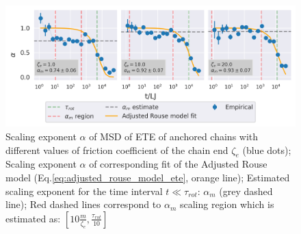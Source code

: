 \documentclass[
    paper=A4,pagesize=automedia,fontsize=12pt,
    BCOR=15mm,DIV=22,
    twoside,headinclude,footinclude=false,
    fleqn,             %
    bibliography=totocnumbered,          %
    listof=totoc,                %
    listof=flat,                 %
    cleardoublepage=empty      %
    numbers=endperiod
]{scrartcl}
\begin{document}
\begin{figure}
    \centering
    \includegraphics[width=\textwidth]{14+15+16-exp-alpha.png}
    \caption{Scaling exponent $\alpha$ of MSD of ETE 
    of anchored chains with different values of
    friction coefficient of the chain end $\zeta_e$ (blue dots);
    Scaling exponent $\alpha$ of corresponding fit
    of the Adjusted Rouse model (Eq.\ref{eq:adjusted_rouse_model_ete}, 
    orange line); Estimated scaling exponent for the time interval
    $t \ll \tau_{rot}$: $\alpha_m$ (grey dashed line); Red dashed lines
    correspond to $\alpha_m$ scaling region which is estimated as:
    $[10 \frac{m}{\zeta_e}, \frac{\tau_{rot}}{10}]$
    }
    \label{fig:alpha_anchored_zeta}
\end{figure}
\end{document}
